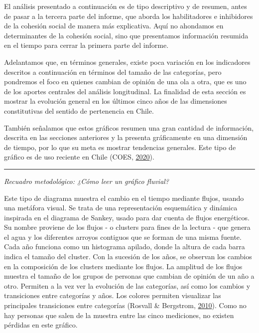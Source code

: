 \documentclass[
  12pt,
]{book}
\begin{document}
El análisis presentado a continuación es de tipo descriptivo y de resumen, antes de pasar a la tercera parte del informe, que aborda los habilitadores e inhibidores de la cohesión social de manera más explicativa. Aquí no ahondamos en determinantes de la cohesión social, sino que presentamos información resumida en el tiempo para cerrar la primera parte del informe.

Adelantamos que, en términos generales, existe poca variación en los indicadores descritos a continuación en términos del tamaño de las categorías, pero pondremos el foco en quienes cambian de opinión de una ola a otra, que es uno de los aportes centrales del análisis longitudinal. La finalidad de esta sección es mostrar la evolución general en los últimos cinco años de las dimensiones constitutivas del sentido de pertenencia en Chile.

También señalamos que estos gráficos resumen una gran cantidad de información, descrita en las secciones anteriores y la presenta gráficamente en una dimensión de tiempo, por lo que su meta es mostrar tendencias generales. Este tipo de gráfico es de uso reciente en Chile (COES, \protect\hyperlink{ref-coes_radiografia_2020}{2020}).

\begin{center}\rule{0.5\linewidth}{0.5pt}\end{center}

\emph{Recuadro metodológico: ¿Cómo leer un gráfico fluvial?}

Este tipo de diagrama muestra el cambio en el tiempo mediante flujos, usando una metáfora visual. Se trata de una representación esquemática y dinámica inspirada en el diagrama de Sankey, usado para dar cuenta de flujos energéticos. Su nombre proviene de los flujos - o clusters para fines de la lectura - que genera el agua y los diferentes arroyos contiguos que se forman de una misma fuente. Cada año funciona como un histograma apilado, donde la altura de cada barra indica el tamaño del cluster. Con la sucesión de los años, se observan los cambios en la composición de los clusters mediante los flujos. La amplitud de los flujos muestra el tamaño de los grupos de personas que cambian de opinión de un año a otro. Permiten a la vez ver la evolución de las categorías, así como los cambios y transiciones entre categorías y años. Los colores permiten visualizar las principales transiciones entre categorías (Rosvall \& Bergstrom, \protect\hyperlink{ref-rosvall_mapping_2010}{2010}). Como no hay personas que salen de la muestra entre las cinco mediciones, no existen pérdidas en este gráfico.
\end{document}
